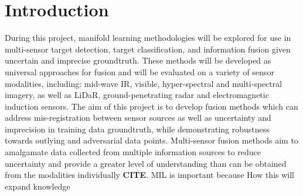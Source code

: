 \chapter{Introduction}

During this project, manifold learning methodologies will be explored for use in multi-sensor target detection, target classification, and information fusion given uncertain and imprecise groundtruth.  These methods will be developed as universal approaches for fusion and will be evaluated on a variety of sensor modalities, including: mid-wave IR, visible, hyper-spectral and multi-spectral imagery, as well as LiDaR, ground-penetrating radar and electromagnetic induction sensors.  The aim of this project is to develop fusion methods which can address mis-registration between sensor sources as well as uncertainty and imprecision in training data groundtruth, while demonstrating robustness towards outlying and adversarial data points. \newline
Multi-sensor fusion methods aim to amalgamate data collected from multiple information sources to reduce uncertainty and provide a greater level of understanding than can be obtained from the modalities individually \textbf{CITE}.
MIL is important because
\newline
How this will expand knowledge
